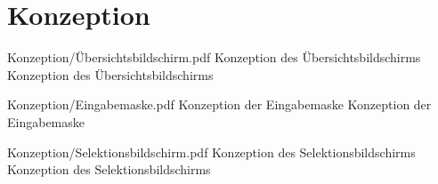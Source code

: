 \chapter{Konzeption}
\label{chap:Konzeption}



\begin{alexfigure}{Konzeption/Übersichtsbildschirm.pdf}
    {Konzeption des Übersichtsbildschirms}
    {Konzeption des Übersichtsbildschirms}
  
    \label{fig:Schritt4EingabemaskeDNBiodiv}
  
  \end{alexfigure}

  \begin{alexfigure}{Konzeption/Eingabemaske.pdf}
    {Konzeption der Eingabemaske}
    {Konzeption der Eingabemaske}
  
    \label{fig:Schritt4EingabemaskeDNBiodiv}
  
  \end{alexfigure}

  \begin{alexfigure}{Konzeption/Selektionsbildschirm.pdf}
    {Konzeption des Selektionsbildschirms}
    {Konzeption des Selektionsbildschirms}
  
    \label{fig:Schritt4EingabemaskeDNBiodiv}
  
  \end{alexfigure}